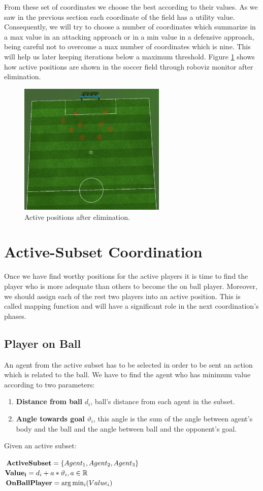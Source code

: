 From these set of coordinates we choose the best according to their values. As we saw in the previous section each coordinate of the field has a utility value. Consequently, we will try to choose a number of coordinates which summarize in a max value in an attacking approach or in a min value in a defensive approach, being careful not to overcome a max number of coordinates which is nine. This will help us later keeping iterations below a maximum threshold. Figure \ref{fig:ActivePositions3} shows how active positions are shown in the soccer field through roboviz monitor after elimination. 
\begin{figure}[htb!]
\centering
  \includegraphics[width=7cm]{Chapter4/figures/Active3.png}
  \caption{Active positions after elimination.} 
  \label{fig:ActivePositions3}
\end{figure}


\section{Active-Subset Coordination}
Once we have find worthy positions for the active players it is time to find the player who is more adequate than others to become the on ball player. Moreover, we should assign each of the rest two players into an active position. This is called mapping function and will have a significant role in the next coordination's phases. 
\subsection{Player on Ball}
An agent from the active subset has to be selected in order to be sent an action which is related to the ball. We have to find the agent who has minimum value according to two parameters:
\begin{enumerate}
\item \textbf{Distance from ball} $d_{i}$, ball's distance from each agent in the subset. 
\item \textbf{Angle towards goal} $\vartheta_{i}$, this angle is the sum of  the angle between agent's body and the ball and the angle between ball and the opponent's goal.
\end{enumerate}
Given an active subset:
\begin{center}
${\bf ActiveSubset} = \lbrace Agent_{1},Agent_{2},Agent_{3} \rbrace $\\
${\bf Value_{i}} = d_{i} + a \ast \vartheta_{i}, a\in\mathbb{R}$\\
${\bf OnBallPlayer} = \arg\min_{i}(Value_{i}) $\\
\end{center}

